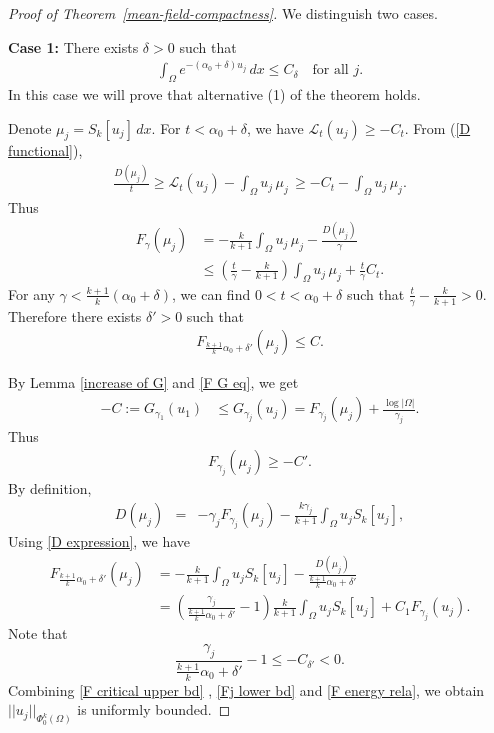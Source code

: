 \documentclass[11pt]{amsart}
\numberwithin{equation}{section}
\numberwithin{equation}{section}
\begin{document}
\begin{proof}[Proof of Theorem~\ref{mean-field-compactness}]
We distinguish two cases.  
\medskip

\noindent\textbf{Case 1:} There exists $\delta>0$ such that
\begin{align}\label{regular condition}
	\int_{\Omega}e^{-(\alpha_0+\delta)u_j}\,dx\leq C_\delta\quad
	\text{for all } j.
\end{align}
In this case we will prove that alternative (1) of the theorem holds.
	
Denote $\mu_j=S_k[u_j]\,dx$. 
For $t<\alpha_0+\delta$, we have $\mathcal{L}_{t}(u_j)\ge -C_t$. From (\ref{D functional}),
\begin{align*}
	\frac{D(\mu_j)}{t}\ge \mathcal{L}_{t}(u_{j})-\int_\Omega u_{j}\,\mu_j\,\ge -C_t-\int_\Omega u_{j}\,\mu_j.
\end{align*}
Thus
\begin{align*}
F_{\gamma}(\mu_j)
&=-\frac{k}{k+1}\int_\Omega u_{j}\,\mu_j-\frac{D(\mu_j)}{\gamma}\\
&\le \left(\frac{t}{\gamma}-\frac{k}{k+1}\right)\int_\Omega u_{j}\,\mu_j + \frac{t}{\gamma}C_t.
\end{align*}
For any $\gamma<\frac{k+1}{k}(\alpha_0+\delta)$, we can find $0<t<\alpha_0+\delta$ such that $\frac{t}{\gamma}-\frac{k}{k+1}>0$. Therefore there exists $\delta'>0$ such that 
\begin{align}\label{F critical upper bd}
	F_{\frac{k+1}{k}\alpha_0+\delta'}(\mu_j)\le C.
\end{align}


By Lemma \ref{increase of G} and \eqref{F G eq}, we get 
\begin{align}
		-C:=G_{\gamma_1}(u_1)
		&\le G_{\gamma_j}(u_j)=F_{\gamma_j}(\mu_j)+\frac{\log |\Omega|}{\gamma_j}.\nonumber
\end{align}
Thus
\begin{align}\label{Fj lower bd}
	F_{\gamma_j}(\mu_j)\ge -C' .
\end{align}
	By definition,
	\begin{eqnarray}
	D(\mu_j)&=&-\gamma_jF_{\gamma_j}(\mu_j)-\frac{k\gamma_j}{k+1}\int_\Omega u_jS_k[u_j],\label{D expression}
	\end{eqnarray}
	Using \eqref{D expression}, we have
	\begin{align}
	F_{\frac{k+1}{k}\alpha_0+\delta'}(\mu_j)
	&=-\frac{k}{k+1}\int_\Omega u_jS_k[u_j]-\frac{D(\mu_j)}{\frac{k+1}{k}\alpha_0+\delta'}\nonumber\\
	&=\left(\frac{\gamma_j}{\frac{k+1}{k}\alpha_0+\delta'}-1\right)\frac{k}{k+1}\int_\Omega u_jS_k[u_j]+C_1F_{\gamma_j}(u_j).\label{F energy rela}
	\end{align}
	Note that \[\frac{\gamma_j}{\frac{k+1}{k}\alpha_0+\delta'}-1\le -C_{\delta'}<0.\] 
	Combining \eqref{F critical upper bd} , \eqref{Fj lower bd} and \eqref{F energy rela}, we obtain $||u_j||_{\Phi_{0}^k(\Omega)}$ is uniformly bounded.
	

\end{proof}
\end{document}
